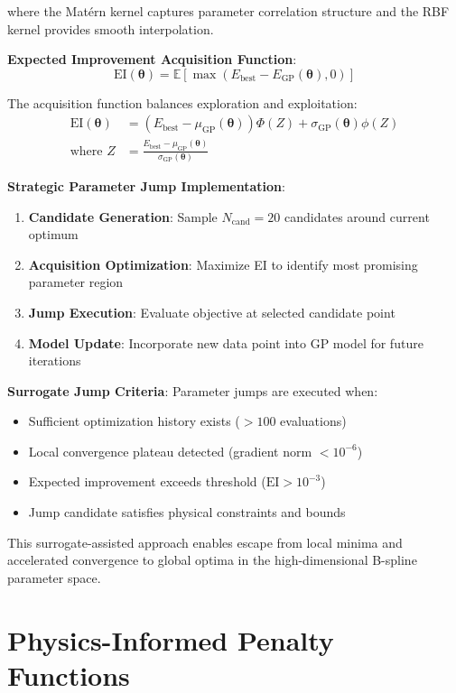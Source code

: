 \documentclass[12pt,a4paper]{article}
\begin{document}
where the Matérn kernel captures parameter correlation structure and the RBF kernel provides smooth interpolation.

\textbf{Expected Improvement Acquisition Function}:
\begin{equation}
\text{EI}(\boldsymbol{\theta}) = \mathbb{E}[\max(E_{\text{best}} - E_{\text{GP}}(\boldsymbol{\theta}), 0)]
\end{equation}

The acquisition function balances exploration and exploitation:
\begin{align}
\text{EI}(\boldsymbol{\theta}) &= (E_{\text{best}} - \mu_{\text{GP}}(\boldsymbol{\theta})) \Phi(Z) + \sigma_{\text{GP}}(\boldsymbol{\theta}) \phi(Z) \\
\text{where } Z &= \frac{E_{\text{best}} - \mu_{\text{GP}}(\boldsymbol{\theta})}{\sigma_{\text{GP}}(\boldsymbol{\theta})}
\end{align}

\textbf{Strategic Parameter Jump Implementation}:
\begin{enumerate}
\item \textbf{Candidate Generation}: Sample $N_{\text{cand}} = 20$ candidates around current optimum
\item \textbf{Acquisition Optimization}: Maximize EI to identify most promising parameter region
\item \textbf{Jump Execution}: Evaluate objective at selected candidate point
\item \textbf{Model Update}: Incorporate new data point into GP model for future iterations
\end{enumerate}

\textbf{Surrogate Jump Criteria}:
Parameter jumps are executed when:
\begin{itemize}
\item Sufficient optimization history exists ($>100$ evaluations)
\item Local convergence plateau detected (gradient norm $< 10^{-6}$)
\item Expected improvement exceeds threshold ($\text{EI} > 10^{-3}$)
\item Jump candidate satisfies physical constraints and bounds
\end{itemize}

This surrogate-assisted approach enables escape from local minima and accelerated convergence to global optima in the high-dimensional B-spline parameter space.

\section{Physics-Informed Penalty Functions}
\end{document}

